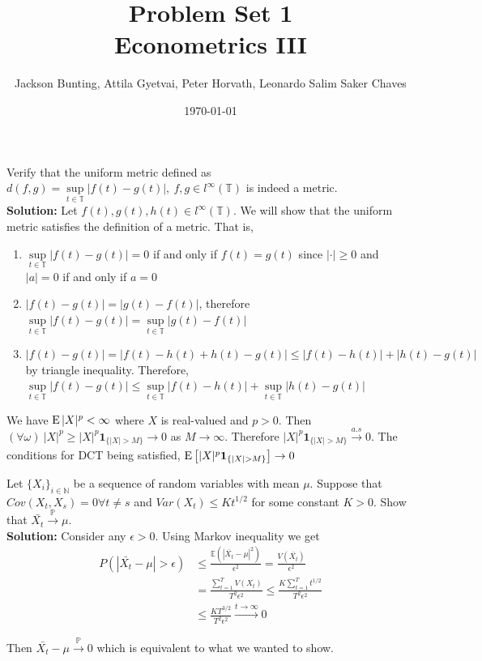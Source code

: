 \documentclass[11pt,letterpaper]{article}                  %
\title{Problem Set 1 \\ \medskip \Large{Econometrics III}}
\author{\Large Jackson Bunting, Attila Gyetvai, Peter Horvath, Leonardo Salim Saker Chaves}
\date{\today}
\begin{document}
\maketitle
\begin{problem}
Verify that the uniform metric defined as $d (f, g) = \sup\limits_{t \in \mathbb{T}} |f(t) - g(t)|, \:  f, g \in l^{\infty}(\mathbb{T})$ is indeed a metric. \\

\textbf{Solution:} Let $f(t), g(t), h(t) \in l^{\infty}(\mathbb{T})$. We will show that the uniform metric satisfies the definition of a metric. That is, 
\begin{enumerate}
	\item  $\sup\limits_{t \in \mathbb{T}} |f(t) - g(t)| = 0$ if and only if $f(t) = g(t)$ since $|\cdot| \geq 0$ and $|a| = 0$ if and only if $a = 0$
	\item  $|f(t) - g(t)| = |g(t) - f(t)|$, therefore $\sup\limits_{t \in \mathbb{T}} |f(t) - g(t)| = \sup\limits_{t \in \mathbb{T}} |g(t) - f(t)|$
	\item $|f(t) - g(t)| = |f(t) - h(t) + h(t) - g(t)| \leq |f(t) - h(t)| +  |h(t) - g(t)|$ by triangle inequality. Therefore, $\sup\limits_{t \in \mathbb{T}} |f(t) - g(t)| \leq  \sup\limits_{t \in \mathbb{T}} |f(t) - h(t)| + \sup\limits_{t \in \mathbb{T}} |h(t) - g(t)|$
\end{enumerate}
\end{problem}

\bigskip
\begin{problem}
We have $\operatorname{E}|X|^p < \infty$ where $X$ is real-valued and $p > 0$. Then
$(\forall \omega ) \  |X|^p \ge |X|^p \mathbf{1}_{\{|X|>M\}}
\rightarrow 0$ as $M \rightarrow \infty$. Therefore $|X|^p \mathbf{1}_{\{|X|>M\}}
\xrightarrow[]{a.s} 0$. The conditions for DCT being satisfied, $\E \left[|X|^p \mathbf{1}_{\{|X|>M\}}\right]
\rightarrow 0$
\end{problem}

\bigskip
\begin{problem}
Let $\{X_i\}_{i \in \mathbb{N}}$ be a sequence of random variables with mean $\mu$. Suppose that $Cov(X_t,X_s)=0 \forall t\neq s$ and $Var(X_t) \leq Kt^{1/2}$ for some constant $K>0$. Show that $\bar{X_t} \overset{\mathbb{P}}{\rightarrow} \mu$.\\

\textbf{Solution:} Consider any $\epsilon>0$. Using Markov inequality we get
\begin{align*}
P(|\bar{X_t} - \mu| > \epsilon) &\leq \frac{\mathbb{E}( |\bar{X_t} - \mu|^2)}{\epsilon^2} = \frac{V(\bar{X_t})}{\epsilon^2} \\
&= \frac{\sum_{t=1}^T V(X_t)}{T^2 \epsilon^2} \le \frac{K \sum_{t=1}^T t^{1/2}}{T^2 \epsilon^2} \\
&\leq \frac{K T^{3/2}}{T^2 \epsilon^2} \overset{t \to \infty}{\longrightarrow} 0
\end{align*}

Then $\bar{X_t} - \mu \overset{\mathbb{P}}{\rightarrow} 0$ which is equivalent to what we wanted to show.
\end{problem}
\end{document}
